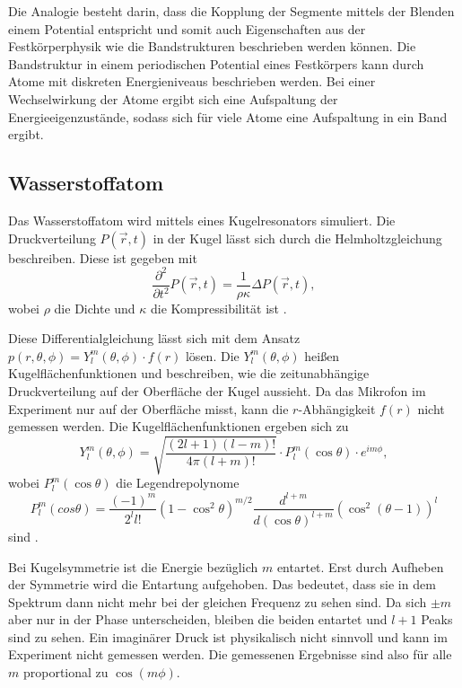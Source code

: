 Die Analogie besteht darin, dass die Kopplung der Segmente mittels der Blenden einem Potential entspricht und somit auch Eigenschaften aus der Festkörperphysik wie die Bandstrukturen beschrieben werden können. 
Die Bandstruktur in einem periodischen Potential eines Festkörpers kann durch Atome mit diskreten Energieniveaus beschrieben werden. Bei einer Wechselwirkung der Atome ergibt sich eine Aufspaltung der Energieeigenzustände, sodass sich für viele Atome eine Aufspaltung in ein Band ergibt. \cite{QM2}


\subsection{Wasserstoffatom}
\label{sec:Wasserstoff}
Das Wasserstoffatom wird mittels eines Kugelresonators simuliert. Die Druckverteilung $P(\vec r,t)$ in der Kugel lässt sich durch die Helmholtzgleichung beschreiben. 
Diese ist gegeben mit 
\begin{equation*}
    \frac{\partial^2}{\partial t^2} P(\vec r,t) = \frac{1}{\rho\kappa} \Delta P(\vec r,t),
\end{equation*}
wobei $\rho$ die Dichte und $\kappa$ die Kompressibilität ist \cite{QM1}. 

Diese Differentialgleichung lässt sich mit dem Ansatz $p(r, \theta, \phi) = Y^m_l(\theta, \phi) \cdot f(r)$ lösen.
Die $Y^m_l(\theta, \phi)$ heißen Kugelflächenfunktionen und beschreiben, wie die zeitunabhängige Druckverteilung auf der Oberfläche der Kugel aussieht. 
Da das Mikrofon im Experiment nur auf der Oberfläche misst, kann die $r$-Abhängigkeit $f(r)$ nicht gemessen werden. 
Die Kugelflächenfunktionen ergeben sich zu 
\begin{equation*}
    Y^m_l (\theta, \phi) = \sqrt{\frac{(2l+1)(l-m)!}{4\pi(l+m)!}} \cdot P^m_l(\cos \theta) \cdot e^{i m \phi},
\end{equation*}
wobei $P^m_l(\cos \theta)$ die Legendrepolynome 
\begin{equation*}
P^m_l(cos \theta) = \frac{(-1)^m}{2^l l!} (1- \cos^2 \theta)^{m/2} \frac{d^{l+m}}{d(\cos \theta)^{l+m}} (\cos^2 (\theta -1))^l
\end{equation*}
sind \cite{QM1}.

Bei Kugelsymmetrie ist die Energie bezüglich $m$ entartet. 
Erst durch Aufheben der Symmetrie wird die Entartung aufgehoben.  
Das bedeutet, dass sie in dem Spektrum dann nicht mehr bei der gleichen Frequenz zu sehen sind. Da sich $\pm m$ aber nur in der Phase unterscheiden, bleiben die beiden entartet und $l+1$ Peaks sind zu sehen. 
Ein imaginärer Druck ist physikalisch nicht sinnvoll und kann im Experiment nicht gemessen werden. Die gemessenen Ergebnisse sind also für alle $m$ proportional zu $\cos(m\phi)$. 

